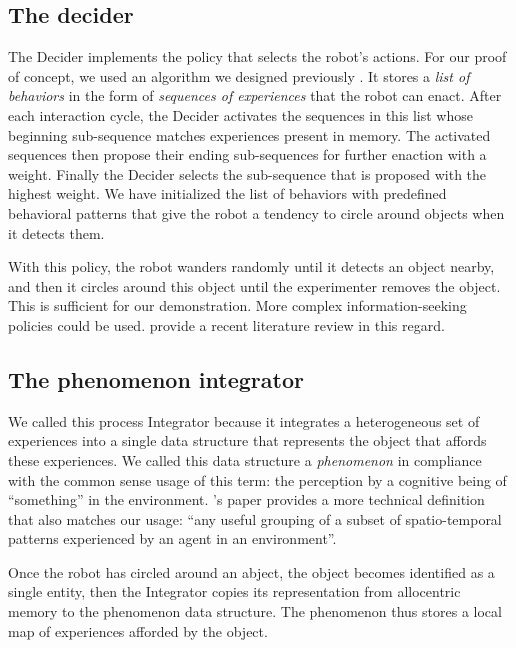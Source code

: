 \documentclass[pmlr]{jmlr}%
\begin{document}
\subsection{The decider}
\label{sec:decider}

The Decider implements the policy that selects the robot's actions. 
For our proof of concept, we used an algorithm we designed previously \citep{georgeon_eca_2013}.
It stores a \textit{list of behaviors} in the form of \textit{sequences of experiences} that the robot can enact. 
After each interaction cycle, the Decider activates the sequences in this list whose beginning sub-sequence matches experiences present in memory. 
The activated sequences then propose their ending sub-sequences for further enaction with a weight. 
Finally the Decider selects the sub-sequence that is proposed with the highest weight. 
We have initialized the list of behaviors with predefined behavioral patterns that give the robot a tendency to circle around objects when it detects them. 

With this policy, the robot wanders randomly until it detects an object nearby, and then it circles around this object until the experimenter removes the object. 
This is sufficient for our demonstration. 
More complex information-seeking policies could be used. 
\cite{gottlieb_towards_2018} provide a recent literature review in this regard. 

\subsection{The phenomenon integrator}

We called this process Integrator because it integrates a heterogeneous set of experiences into a single data structure that represents the object that affords these experiences. 
We called this data structure a \textit{phenomenon} in compliance with the common sense usage of this term: the perception by a cognitive being of ``something'' in the environment.
\cite{thorisson_explanation_2021}'s paper provides a more technical definition that also matches our usage: ``any useful grouping of a subset of spatio-temporal patterns experienced by an agent in an environment''.


Once the robot has circled around an abject, the object becomes identified as a single entity, then the Integrator copies its representation from allocentric memory to the phenomenon data structure.
The phenomenon thus stores a local map of experiences afforded by the object. 
\end{document}
